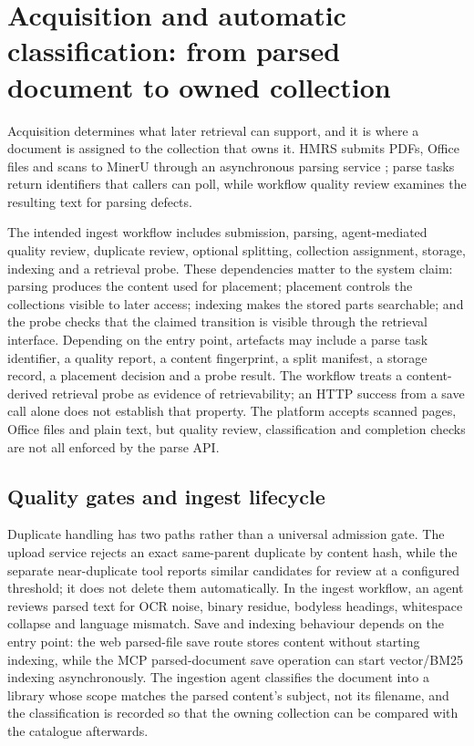 \section{Acquisition and automatic classification: from parsed document to
owned collection}
\label{sec:acquisition}

Acquisition determines what later retrieval can support, and it is where a
document is assigned to the collection that owns it. HMRS submits PDFs,
Office files and scans to MinerU through an asynchronous parsing service
\citep{mineru}; parse tasks return identifiers that callers can poll, while
workflow quality review examines the resulting text for parsing defects.

The intended ingest workflow includes submission, parsing,
agent-mediated quality review, duplicate review, optional splitting, collection
assignment, storage, indexing and a retrieval probe. These dependencies matter to
the system claim: parsing produces the content used for placement; placement
controls the collections visible to later access; indexing makes the stored
parts searchable; and the probe checks that the claimed transition is visible
through the retrieval interface. Depending on the entry point, artefacts may
include a parse task identifier, a quality report, a content fingerprint, a
split manifest, a storage record, a placement decision and a probe result. The
workflow treats a content-derived retrieval probe as evidence of retrievability;
an HTTP success from a save call alone does not establish that property. The
platform accepts scanned pages, Office files and plain text, but quality review,
classification and completion checks are not all enforced by the parse API.

\subsection{Quality gates and ingest lifecycle}

Duplicate handling has two paths rather than a universal admission gate. The
upload service rejects an exact same-parent duplicate by content hash, while
the separate near-duplicate tool reports similar candidates for review at a
configured threshold; it does not delete them automatically. In the ingest
workflow, an agent reviews parsed text for OCR noise, binary residue, bodyless
headings, whitespace collapse and language mismatch. Save and indexing behaviour
depends on the entry point: the web parsed-file save route stores content
without starting indexing, while the MCP parsed-document save operation can
start vector/BM25 indexing asynchronously. The ingestion agent classifies the document into a library whose scope matches
the parsed content's subject, not its filename, and the classification is
recorded so that the owning collection can be compared with the catalogue
afterwards.

